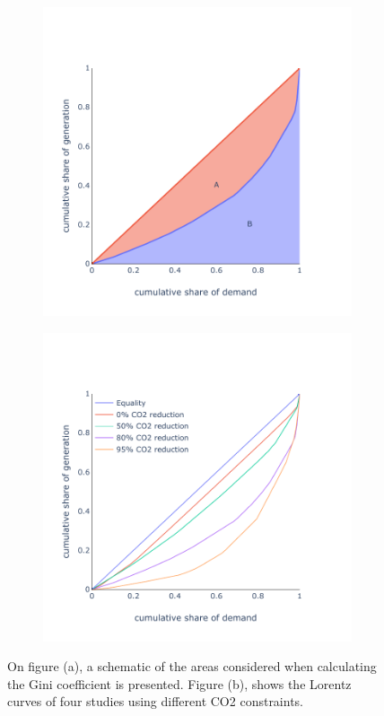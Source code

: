 \begin{figure}[h]\centering
	\begin{subfigure}{.5\textwidth}
		\centering
		\includegraphics[width=1.\textwidth]{./Images/Gini_1}
		\caption{}
		\label{fig:Gini_1}
	\end{subfigure}%
	\begin{subfigure}{.5\textwidth}
		\centering
		\includegraphics[width=1.\textwidth]{./Images/Gini_2}
		\caption{}
		\label{fig:Gini_2}
	\end{subfigure}
	\caption{On figure (a), a schematic of the areas considered when calculating the Gini coefficient is presented. Figure (b), shows the Lorentz curves of four studies using different CO2 constraints.}
	\label{fig:Gini}
\end{figure}







